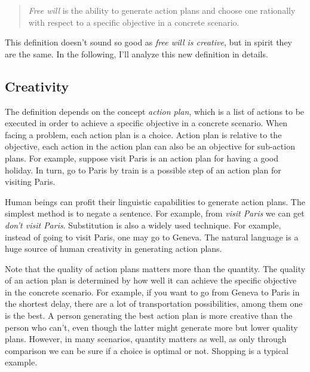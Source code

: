 \begin{quote}
\emph{Free will} is the ability to generate action plans and choose one rationally with respect to a specific objective in a concrete scenario.

\end{quote}

This definition doesn't sound so good as \emph{free will is creative}, but in spirit they are the same. In the following, I'll analyze this new definition in details.


\subsection{Creativity}

The definition depends on the concept \emph{action plan}, which is a list of actions to be executed in order to achieve a specific objective in a concrete scenario. When facing a problem, each action plan is a choice. Action plan is relative to the objective, each action in the action plan can also be an objective for sub-action plans. For example, suppose visit Paris is an action plan for having a good holiday. In turn, go to Paris by train is a possible step of an action plan for visiting Paris.

Human beings can profit their linguistic capabilities to generate action plans. The simplest method is to negate a sentence. For example, from \emph{visit Paris} we can get \emph{don’t visit Paris}. Substitution is also a widely used technique. For example, instead of going to visit Paris, one may go to Geneva. The natural language is a huge source of human creativity in generating action plans.

Note that the quality of action plans matters more than the quantity. The quality of an action plan is determined by how well it can achieve the specific objective in the concrete scenario. For example, if you want to go from Geneva to Paris in the shortest delay, there are a lot of transportation possibilities, among them one is the best. A person generating the best action plan is more creative than the person who can’t, even though the latter might generate more but lower quality plans. However, in many scenarios, quantity matters as well, as only through comparison we can be sure if a choice is optimal or not. Shopping is a typical example.

